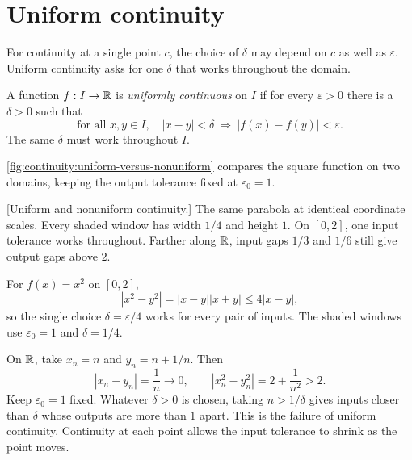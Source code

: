 \section{Uniform continuity}
\label{sec:analysis-i:uniform-continuity}


For continuity at a single point $c$, the choice of $\delta$ may depend
on $c$ as well as $\varepsilon$. Uniform continuity asks for one
$\delta$ that works throughout the domain.

\begin{definition}
  A function $f:I\to\mathbb{R}$ is \emph{uniformly continuous} on $I$ if
  for every $\varepsilon>0$ there is a $\delta>0$ such that
  \[
    \text{for all }x,y\in I,\quad
    |x-y|<\delta\ \Longrightarrow\ |f(x)-f(y)|<\varepsilon.
  \]
  The same $\delta$ must work throughout $I$.
\end{definition}
\autoref{fig:continuity:uniform-versus-nonuniform} compares the square
function on two domains, keeping the output tolerance fixed at
$\varepsilon_0=1$.


\begin{fullwidth}
  \noindent\begin{minipage}{\linewidth}
    \centering
    
    [Uniform and nonuniform continuity.]{%
      The same parabola at identical coordinate scales.
      Every shaded window has width $1/4$ and height $1$. On $[0,2]$,
      one input tolerance works throughout. Farther along $\mathbb{R}$, input
      gaps $1/3$ and $1/6$ still give output gaps above $2$.}
    \label{fig:continuity:uniform-versus-nonuniform}
  \end{minipage}
\end{fullwidth}


For $f(x)=x^2$ on $[0,2]$,
\[
  |x^2-y^2|=|x-y||x+y|\le4|x-y|,
\]
so the single choice $\delta=\varepsilon/4$ works for every pair of
inputs. The shaded windows use $\varepsilon_0=1$ and $\delta=1/4$.

On $\mathbb{R}$, take $x_n=n$ and $y_n=n+1/n$. Then
\[
  |x_n-y_n|=\frac1n\longrightarrow0,
  \qquad |x_n^2-y_n^2|=2+\frac1{n^2}>2.
\]
Keep $\varepsilon_0=1$ fixed. Whatever $\delta>0$ is chosen, taking
$n>1/\delta$ gives inputs closer than $\delta$ whose outputs are more
than $1$ apart. This is the failure of uniform continuity. Continuity
at each point allows the input tolerance to shrink as the point moves.


